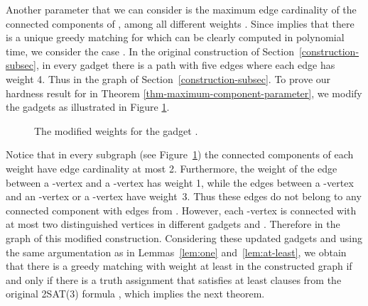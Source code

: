 \documentclass[a4paper,11pt]{article}
\begin{document}
Another parameter that we can consider is the maximum edge cardinality  of
the connected components of , among all different weights . 
Since  implies that there is a unique greedy matching for 
 which can be clearly computed in polynomial time, we consider the case .
In the original construction of Section~\ref{construction-subsec}, in every
gadget  there is a path with five edges where each edge
has weight 4. Thus  in the graph  of Section~\ref{construction-subsec}.
To prove our hardness result for  in Theorem \ref {thm-maximum-component-parameter}, we modify the gadgets  
as illustrated in Figure \ref{gadget-cardinality-parameter-fig}.
\begin{figure}[h]
\label{fig:modgx}
\par
\begin{center}
\end{center}
\par
\caption{The modified weights for the gadget .}
\label{gadget-cardinality-parameter-fig}
\end{figure}

Notice that in every subgraph  (see Figure~\ref {gadget-cardinality-parameter-fig}) the connected components of each weight
have edge cardinality at most 2. Furthermore, the weight of the edge between
a -vertex and a -vertex has weight 1, while the edges between 
a -vertex and an -vertex or a -vertex have weight~3. 
Thus these edges do not belong to any connected component with edges from 
. However, each -vertex is connected with at most
two distinguished vertices in different gadgets  and . Therefore  in the graph  of this
modified construction. Considering these updated gadgets  and using the same argumentation as in Lemmas~\ref{lem:one} and~\ref {lem:at-least}, we obtain that there is a greedy matching with weight at
least  in the constructed graph  if and only if there is a truth
assignment that satisfies at least  clauses from the original 2SAT(3)
formula , which implies the next theorem.
\end{document}
